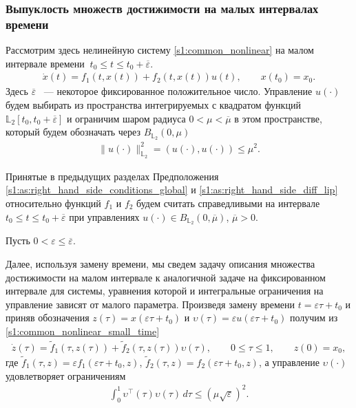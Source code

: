 \documentclass[../main.tex]{subfiles}
\begin{document}
\subsubsection{Выпуклость множеств достижимости на малых интервалах времени}
\label{s1:small_time_subsection}
Рассмотрим здесь нелинейную систему \eqref{s1:common_nonlinear} на малом интервале времени $\ t_0 \leqslant t \leqslant t_0 + \overline{\varepsilon} $.
\begin{gather}\label{s1:common_nonlinear_small_time}
 \dot{x}(t)=f_1(t,x(t))+f_2(t,x(t))u(t), \qquad x(t_0) = x_0.
\end{gather}
Здесь $ \overline{\varepsilon} $ ~--- некоторое фиксированное положительное число.
Управление $u(\cdot)$ будем выбирать из пространства интегрируемых с квадратом функций $\mathbb{L}_2[t_0,t_0+\overline{\varepsilon}]$ и ограничим шаром радиуса $ 0 < \mu < \overline{\mu} $ в этом пространстве, который будем обозначать через $B_{\mathbb{L}_2}(0, \mu)$
\begin{gather*}
 \lVert u(\cdot)\rVert^2_{\mathbb{L}_2} = \left(u(\cdot),u(\cdot) \right) \leqslant \mu^2.
\end{gather*}

Принятые в предыдущих разделах Предположения \ref{s1:as:right_hand_side_conditions_global} и \ref{s1:as:right_hand_side_diff_lip} относительно функций $f_1$ и $f_2$ будем считать справедливыми на интервале $t_0 \leqslant t \leqslant t_0 + \overline{\varepsilon} $ при управлениях $u(\cdot) \in B_{\mathbb{L}_2}(0, \overline{\mu}) $, $\overline{\mu} > 0$.

Пусть $ 0 < \varepsilon \leqslant \overline{\varepsilon} $.
 
 
Далее, используя замену времени, мы сведем задачу описания множества достижимости на малом интервале к аналогичной задаче на фиксированном интервале для системы, уравнения которой и интегральные ограничения на управление зависят от малого параметра.
Произведя замену времени $ t = \varepsilon \tau + t_0 $ и приняв обозначения $ z(\tau) = x(\varepsilon \tau + t_0) $ и $ \upsilon(\tau) = \varepsilon u(\varepsilon \tau + t_0) $ получим из \eqref{s1:common_nonlinear_small_time}
\begin{gather}\label{s1:eps_nonlinear}
 \dot{z}(\tau)=\widetilde{f}_1(\tau,z(\tau))+\widetilde{f}_2(\tau,z(\tau))\upsilon(\tau), \qquad 0 \leqslant \tau \leqslant 1, \qquad z(0) = x_0,
\end{gather}
где $ \widetilde{f}_1(\tau,z) = \varepsilon f_1(\varepsilon \tau + t_0,z) $, $ \widetilde{f}_2 (\tau,z) = f_2(\varepsilon \tau + t_0,z)$, а управление $ \upsilon(\cdot) $ удовлетворяет ограничениям
\begin{gather*}%
 \int_0^1 \upsilon^{\top}(\tau) \upsilon(\tau) \, d\tau \leqslant \left( \mu \sqrt{\varepsilon}\right)^2.
\end{gather*}
\end{document}

